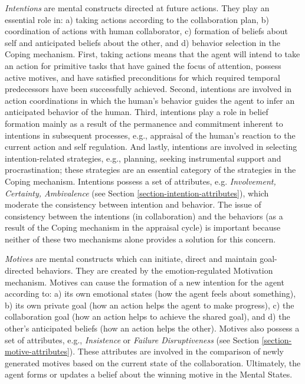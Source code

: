 \documentclass[12pt]{report}
\begin{document}
\textit{Intentions} are mental constructs directed at future actions. They play
an essential role in: a) taking actions according to the collaboration plan, b)
coordination of actions with human collaborator, c) formation of beliefs about
self and anticipated beliefs about the other, and d) behavior selection in the
Coping mechanism. First, taking actions means that the agent will intend to take
an action for primitive tasks that have gained the focus of attention, possess
active motives, and have satisfied preconditions for which required temporal
predecessors have been successfully achieved. Second, intentions are involved
in action coordinations in which the human's behavior guides the agent to infer
an anticipated behavior of the human. Third, intentions play a role in belief
formation mainly as a result of the permanence and commitment inherent to
intentions in subsequent processes, e.g., appraisal of the human's reaction to
the current action and self regulation. And lastly, intentions are involved in
selecting intention-related strategies, e.g., planning, seeking instrumental
support and procrastination; these strategies are an essential category of the
strategies in the Coping mechanism. Intentions possess a set of attributes, e.g.
\textit{Involvement, Certainty, Ambivalence} (see Section
\ref{section-intention-attributes}), which moderate the consistency between
intention and behavior. The issue of consistency between the intentions (in
collaboration) and the behaviors (as a result of the Coping mechanism in the
appraisal cycle) is important because neither of these two mechanisms alone
provides a solution for this concern.

\textit{Motives} are mental constructs which can initiate, direct and maintain
goal-directed behaviors. They are created by the emotion-regulated Motivation
mechanism. Motives can cause the formation of a new intention for the agent
according to: a) its own emotional states (how the agent feels about something),
b) its own private goal (how an action helps the agent to make progress), c) the
collaboration goal (how an action helps to achieve the shared goal), and d) the
other's anticipated beliefs (how an action helps the other). Motives also
possess a set of attributes, e.g., \textit{Insistence} or \textit{Failure
Disruptiveness} (see Section \ref{section-motive-attributes}). These attributes
are involved in the comparison of newly generated motives based on the current
state of the collaboration. Ultimately, the agent forms or updates a belief
about the winning motive in the Mental States.
\end{document}

